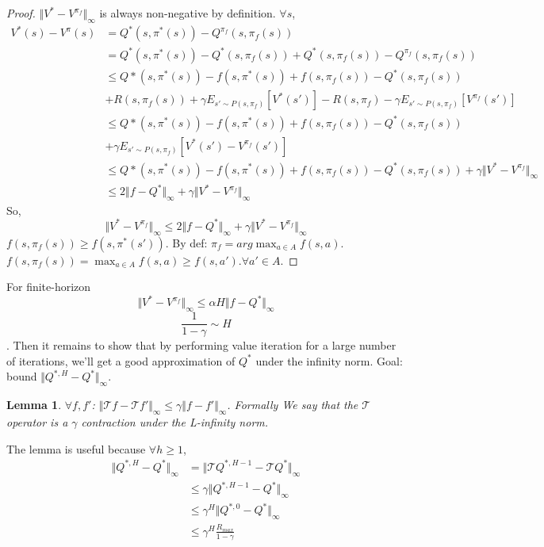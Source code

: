\documentclass{report}
\newtheorem{lemma}[theorem]{Lemma}
\begin{document}
\begin{proof}
$\Vert V^*-V^{\pi_f}\Vert_{\infty}$ is always non-negative by definition. $\forall s$, 
\begin{equation*}
\begin{split}
V^{*}(s)-V^{\pi}(s) &= Q^*(s,\pi^*(s))-Q^{\pi_f}(s,\pi_f(s))\\
&= Q^*(s,\pi^*(s))-Q^*(s,\pi_f(s))+Q^*(s,\pi_f(s))-Q^{\pi_f}(s,\pi_f(s))\\
&\leq Q*(s,\pi^{*}(s))-f(s,\pi^{*}(s))+f(s,\pi_f(s))-Q^*(s,\pi_f(s))\\
& +R(s,\pi_f(s))+\gamma E_{s'\sim P(s,\pi_f)}[V^*(s')]-R(s,\pi_f) - \gamma E_{s'\sim P(s,\pi_f)}[V^{\pi_f}(s')] \\
&\leq Q*(s,\pi^{*}(s))-f(s,\pi^{*}(s))+f(s,\pi_f(s))-Q^*(s,\pi_f(s))\\
&+ \gamma E_{s'\sim P(s,\pi_f)}[V^*(s')-V^{\pi_f}(s')] \\
&\leq Q*(s,\pi^{*}(s))-f(s,\pi^{*}(s))+f(s,\pi_f(s))-Q^*(s,\pi_f(s)) + \gamma \Vert V^*-V^{\pi_f} \Vert_{\infty} \\
&\leq 2\Vert f-Q^*\Vert_{\infty} + \gamma \Vert V^*-V^{\pi_f} \Vert_{\infty}
\end{split}
\end{equation*}
So, \[
\Vert V^*-V^{\pi_f} \Vert_{\infty} \leq 2\Vert f-Q^*\Vert_{\infty} + \gamma \Vert V^*-V^{\pi_f} \Vert_{\infty}
\]
$f(s,\pi_f(s)) \geq f(s,\pi^*(s'))$. By def: $\pi_f=arg\max_{a\in A}f(s,a)$. $f(s,\pi_f(s))=\max_{a\in A}f(s,a) \geq f(s,a'). \forall a' \in A$.
\end{proof}
For finite-horizon \[\Vert  V^*-V^{ \pi_f} \Vert_{\infty} \leq \alpha H \Vert f-Q^{*}\Vert_{\infty}\]
\[\frac{1}{1-\gamma} \sim H\].
Then it remains to show that by performing value iteration for a large number of iterations, we'll get a good  approximation of $Q^*$ under the infinity norm. Goal: bound $\Vert Q^{*,H}-Q^{*}\Vert_{\infty}$.
\begin{lemma}
$\forall f,f'$: $\Vert\mathcal{T}f-\mathcal{T}f'\Vert_{\infty}\leq \gamma \Vert f-f'\Vert_{\infty}$. Formally We say that the $\mathcal{T}$ operator is a $\gamma$ contraction under the L-infinity norm.
\end{lemma}
The lemma is useful because $\forall h \geq 1$, 
\begin{equation*}
\begin{split}
    \Vert Q^{*,H}-Q^{*}\Vert_{\infty}&=\Vert \mathcal{T}Q^{*,H-1}-\mathcal{T}Q^{*}\Vert_{\infty}\\
    & \leq \gamma \Vert Q^{*,H-1}-Q^{*}\Vert_{\infty} \\
    & \leq \gamma^H \Vert Q^{*,0}-Q^{*}\Vert_{\infty} \\
    & \leq \gamma^{H} \frac{R_{max}}{1-\gamma}
\end{split}
\end{equation*}
\end{document}
